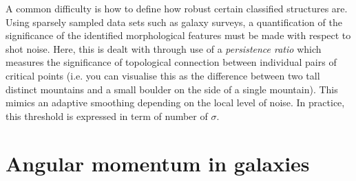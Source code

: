 A common difficulty is how to define how robust certain classified structures are. Using sparsely sampled data sets such as galaxy surveys, a quantification of the significance of the identified morphological features must be made with respect to shot noise. Here, this is dealt with through use of a \textit{persistence ratio} which measures the significance of topological connection between individual pairs of critical points (i.e. you can visualise this as the difference between two tall distinct mountains and a small boulder on the side of a single mountain). This mimics an adaptive smoothing depending on the local level of noise. In practice, this threshold is expressed in term of number of $\sigma$. 



\section{Angular momentum in galaxies} \label{sec:ang_mom_intro}
